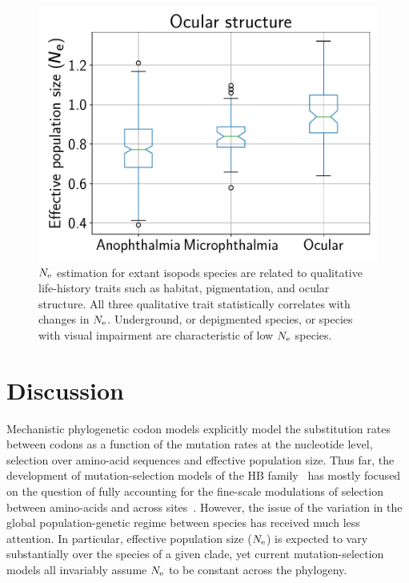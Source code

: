 \documentclass{MBE}
\begin{document}
\begin{figure}[ht]
\begin{minipage}{0.32\linewidth}
			\includegraphics[width=\linewidth, page=1]{isopods/12CDS_SiteMutSelBranchNe_Rep_LogPopulationSize_eye_merged}
		\end{minipage}
		\caption[$\Ne$ as a function of traits in isopods]{
		$\Ne$ estimation for extant isopods species are related to qualitative life-history traits such as habitat, pigmentation, and ocular structure.
		All three qualitative trait statistically correlates with changes in $\Ne$.
		Underground, or depigmented species, or species with visual impairment are characteristic of low $\Ne$ species.}
		\label{fig:isopods_correlation}
	\end{figure}


	\section{Discussion}
	\label{sec:Discussion}
	Mechanistic phylogenetic {codon} models explicitly model the {substitution} rates between codons as a function of the mutation rates at the nucleotide level, selection over amino-acid sequences and {effective population size}.
	Thus far, the development of mutation-selection models of the {HB} family~\citep{Rodrigue2010, Tamuri2012} has mostly focused on the question of fully accounting for the fine-scale modulations of selection between amino-acids and across sites~\citep{Rodrigue2010, Tamuri2012}.
	However, the issue of the variation in the global population-genetic regime between species has received much less attention.
	In particular, {effective population size} ($\Ne$) is expected to vary substantially over the species of a given clade, yet current mutation-selection models all invariably assume $\Ne$ to be constant across the phylogeny.
\end{document}
